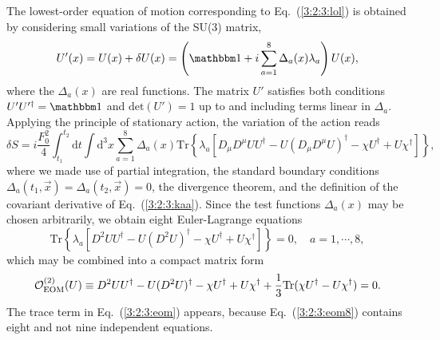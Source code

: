 \documentclass[twoside,12pt]{article}
\begin{document}
   The lowest-order equation of motion corresponding to Eq.\ (\ref{3:2:3:lol})
is obtained by considering small variations of the SU(3) matrix,
\begin{equation}
\label{3:2:3:deltau} U'(x)=U(x)+\delta U(x)=\left({\mathbbm 1}+i\sum_{a=1}^8
\Delta_a(x)\lambda_a\right) U(x),
\end{equation}
where the $\Delta_a(x)$ are real functions.
  The matrix $U'$ satisfies both conditions
$U' U'^\dagger= {\mathbbm 1}$ and $\mbox{det}(U')=1$
up to and including terms linear in $\Delta_a$.
   Applying the principle of stationary action, the variation of the action reads
\begin{displaymath}
\delta S=i\frac{F^2_0}{4}\int_{t_1}^{t_2}\mbox{d}t
\int \mbox{d}^3 x \sum_{a=1}^8
\Delta_a(x) \mbox{Tr}\left\{\lambda_a[
D_\mu D^\mu U U^\dagger- U(D_\mu D^\mu U)^\dagger -\chi U^\dagger
+ U\chi^\dagger]\right\},
\end{displaymath}
where we made use of partial integration, the standard boundary conditions
$\Delta_a(t_1,\vec{x})=\Delta_a(t_2,\vec{x})=0$, the divergence theorem,
and the definition of the covariant derivative of Eq.\ (\ref{3:2:3:kaa}).
   Since the test functions $\Delta_a(x)$ may be chosen arbitrarily, we obtain
eight Euler-Lagrange equations
\begin{equation}
\label{3:2:3:eom8} \mbox{Tr}\left\{\lambda_a[D^2U U^\dagger - U (D^2
U)^\dagger -\chi U^\dagger + U\chi^\dagger]\right\}=0, \quad
a=1,\cdots, 8,
\end{equation}
which may be combined into a compact matrix form
\begin{equation}
\label{3:2:3:eom} {\cal O}_{\rm EOM}^{(2)}(U)\equiv D^2 U U^\dagger -
U (D^2 U)^\dagger -\chi U^\dagger + U \chi^\dagger
+\frac{1}{3}\mbox{Tr}(\chi U^\dagger- U \chi^\dagger)=0.
\end{equation}
   The trace term in Eq.~(\ref{3:2:3:eom}) appears, because Eq.~(\ref{3:2:3:eom8})
contains eight and not nine independent equations.
\end{document}

